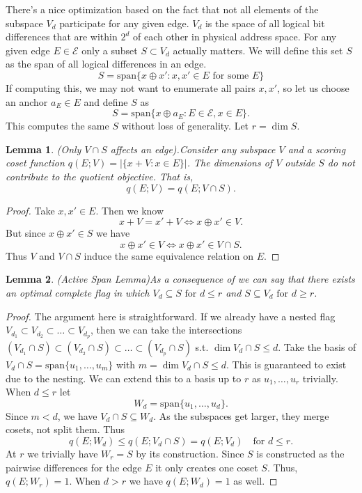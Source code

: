\documentclass[10pt]{article}
\newtheorem{lemma}{Lemma}
\theoremstyle{remark}
\begin{document}
There's a nice optimization based on the fact that not all elements of the subspace $V_d$ participate for any given edge. $V_d$ is the space of all logical bit differences that are within $2^d$ of each other in physical address space. For any given edge $E\in\mathcal{E}$ only a subset $S\subset V_d$ actually matters.
We will define this set $S$ as the span of all logical differences in an edge.
%
\[
S = \mathrm{span}\{x\oplus x' : x,x'\in E \text{ for some } E \}
\]
%
If computing this, we may not want to enumerate all pairs $x,x'$, so let us choose an anchor $a_E\in E$ and define $S$ as 
%
\[
S = \mathrm{span}\{x \oplus a_E : E \in \mathcal{E}, x \in E\}.
\]
%
This computes the same $S$ without loss of generality. Let $r = \dim S$.

\begin{lemma}{(Only $V\cap S$ affects an edge).}\label{lem:v_cap_s}
Consider any subspace $V$ and a scoring coset function $q(E; V) = \left| \{x+V : x\in E\} \right|$. The dimensions of $V$ outside $S$ do not contribute to the quotient objective. That is,
%
\[
q(E;V) = q(E; V \cap S).
\]
\end{lemma}

\begin{proof}
    Take $x,x' \in E$. Then we know
    \[
    x+V = x'+V \iff x\oplus x' \in V.
    \]
    But since $x\oplus x' \in S$ we have
    \[
    x \oplus x' \in V \iff x \oplus x' \in V \cap S.
    \]
    Thus $V$ and $V\cap S$ induce the same equivalence relation on $E$.
\end{proof}

\begin{lemma}{(Active Span Lemma)}\label{lem:active_span}
    As a consequence of  we can say that there exists an optimal complete flag in which $V_d \subseteq S\,\, \text{for } d\le r$ and $S\subseteq V_d \,\, \text{for } d \ge r$.
\end{lemma}

\begin{proof}
    The argument here is straightforward. If we already have a nested flag $V_{d_1}\subset V_{d_2}\subset \ldots \subset V_{d_p}$, then we can take the intersections $(V_{d_1}\cap S) \subset (V_{d_2} \cap S) \subset \ldots \subset (V_{d_p} \cap S)$ s.t. $\dim V_d\cap S \le d$. Take the basis of $V_d \cap S = \text{span}\{u_1, \ldots, u_m\}$ with $m=\dim V_d\cap S \le d$. This is guaranteed to exist due to the nesting. We can extend this to a basis up to $r$ as $u_1,\ldots,u_r$ trivially. When $d\le r$ let
    \[
    W_d = \text{span}\{u_1,\ldots,u_d\}.
    \]
    Since $m<d$, we have $V_d\cap S\subseteq W_d$. As the subspaces get larger, they merge cosets, not split them. Thus
    \[
    q(E; W_d) \le q(E; V_d \cap S) = q(E; V_d)\quad \text{for } d\le r.
    \]
    At $r$ we trivially have $W_r=S$ by its construction. Since $S$ is constructed as the pairwise differences for the edge $E$ it only creates one coset $S$. Thus, $q(E; W_r) = 1$.
    When $d>r$ we have $q(E; W_d) = 1$ as well.
\end{proof}
\end{document}
